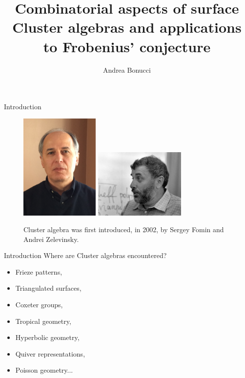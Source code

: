 \documentclass{beamer}
\title[Cluster algebras and Frobenius' conjecture]{Combinatorial aspects of surface Cluster algebras and applications to Frobenius' conjecture}
\institute[VU]{Vrije Universiteit}
\author{Andrea Bonucci}
\begin{document}
\maketitle
\begin{frame}{Introduction} 
    \begin{figure}
        \centering
            \includegraphics[width=0.35\textwidth]{Images/fominphoto.jpg}
            \hfill
            \includegraphics[width=0.4\textwidth]{Images/zelevinskiphoto.jpeg}
        \caption{Cluster algebra was first introduced, in 2002, by Sergey Fomin and Andrei Zelevinsky.}
        \label{fig:my_label}
    \end{figure}
\end{frame}
\begin{frame}{Introduction}
    Where are Cluster algebras encountered?
    \pause
    \begin{itemize}
        \item Frieze patterns,
        \item Triangulated surfaces,
        \item Coxeter groups,
        \item Tropical geometry,
        \item Hyperbolic geometry,
        \item Quiver representations,
        \item Poisson geometry...
    \end{itemize}
\end{frame}
\end{document}
